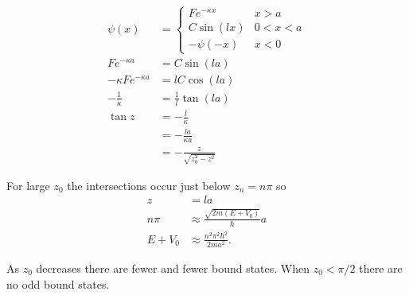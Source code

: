 \documentclass{article}
\begin{document}
\subsection{}

\begin{align*}
  \psi(x)                 & = \begin{cases}
                                F e^{-\kappa x} & x > a     \\
                                C \sin (l x)    & 0 < x < a \\
                                -\psi(-x)       & x < 0
                              \end{cases}   \\
  F e^{-\kappa a}         & = C \sin (l a)                  \\
  -\kappa F e^{-\kappa a} & = l C \cos (l a)                \\
  -\frac{1}{\kappa}       & = \frac{1}{l} \tan (l a)        \\
  \tan z                  & = -\frac{l}{\kappa}             \\
                          & = -\frac{l a}{\kappa a}         \\
                          & = -\frac{z}{\sqrt{z_0^2 - z^2}}
\end{align*}

For large $z_0$ the intersections occur just below $z_n = n \pi$ so \begin{align*}
  z       & = l a                                        \\
  n \pi   & \approx \frac{\sqrt{2 m (E + V_0)}}{\hbar} a \\
  E + V_0 & \approx \frac{n^2 \pi^2 \hbar^2}{2 m a^2}.
\end{align*}

As $z_0$ decreases there are fewer and fewer bound states. When $z_0 < \pi / 2$ there are no odd bound states.

\subsection{}
\end{document}
